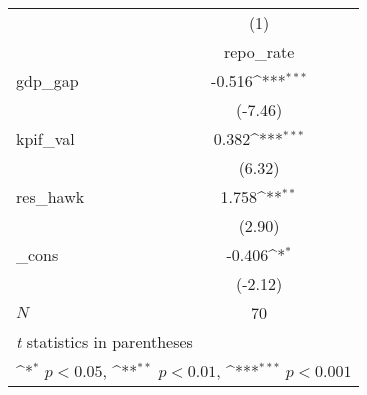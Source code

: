 {
\def\sym#1{\ifmmode^{#1}\else\(^{#1}\)\fi}
\begin{tabular}{l*{1}{c}}
\hline\hline
            &\multicolumn{1}{c}{(1)}\\
            &\multicolumn{1}{c}{repo\_rate}\\
\hline
gdp\_gap     &      -0.516\sym{***}\\
            &     (-7.46)         \\
[1em]
kpif\_val    &       0.382\sym{***}\\
            &      (6.32)         \\
[1em]
res\_hawk    &       1.758\sym{**} \\
            &      (2.90)         \\
[1em]
\_cons      &      -0.406\sym{*}  \\
            &     (-2.12)         \\
\hline
\(N\)       &          70         \\
\hline\hline
\multicolumn{2}{l}{\footnotesize \textit{t} statistics in parentheses}\\
\multicolumn{2}{l}{\footnotesize \sym{*} \(p<0.05\), \sym{**} \(p<0.01\), \sym{***} \(p<0.001\)}\\
\end{tabular}
}
